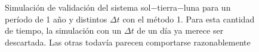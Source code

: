 \begin{figure}
{	\label{fig:ej1_m1_365_12}
	}
	\caption{
		Simulación de validación del sistema sol$-$tierra$-$luna para un período de 1 año y distintos $\Delta t$
		con el método 1.
		Para esta cantidad de tiempo, la simulación con un $\Delta t$ de un día ya merece ser descartada.
		Las otras todavía parecen comportarse razonablemente
	}
	\label{ fig:res_ej1_m1_365 }
\end{figure}
